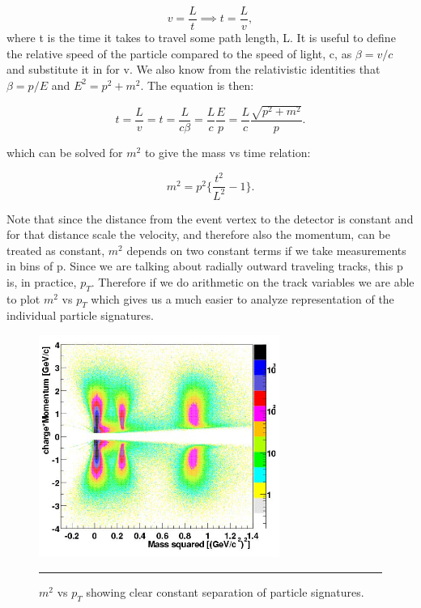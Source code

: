 \begin{equation}
v=\frac{L}{t} \implies t=\frac{L}{v},
\end{equation}
where t is the time it takes to travel some path length, L. It is useful to define the relative speed of the particle compared to the speed of light, c, as $\beta = v/c$ and substitute it in for v. We also know from the relativistic identities that $\beta = p/E$ and $E^{2} = p^{2} + m^{2}$. The equation is then: 

\begin{equation}
t=\frac{L}{v} = t=\frac{L}{c\beta} = \frac{L}{c} \frac{E}{p} = \frac{L}{c} \frac{\sqrt{p^{2} + m^{2}}}{p}.
\end{equation}

which can be solved for $m^{2}$ to give the mass vs time relation:

\begin{equation}
m^{2} = p^{2} \bigg\{ \frac{t^{2}}{L^{2}} -1 \bigg\}.
\end{equation}

Note that since the distance from the event vertex to the detector is constant and for that distance scale the velocity, and therefore also the momentum, can be treated as constant, $m^{2}$ depends on two constant terms if we take measurements in bins of p. Since we are talking about radially outward traveling tracks, this p is, in practice, $p_{T}$. Therefore if we do arithmetic on the track variables we are able to plot $m^{2}$ vs $p_{T}$ which gives us a much easier to analyze representation of the individual particle signatures.

\begin{figure}[htbp!]
  \centering
    \includegraphics[width=0.7\textwidth]{Figures/m2tofvspt.jpg}
    \rule{35em}{0.5pt}
  \caption[$m^{2}$ vs $p_{T}$ showing clear constant separation of particle signatures.]{$m^{2}$ vs $p_{T}$ showing clear constant separation of particle signatures. \citep{tofchargemom}}
  \label{fig:m2tofvspt}
\end{figure}

\pagebreak
\pagebreak
